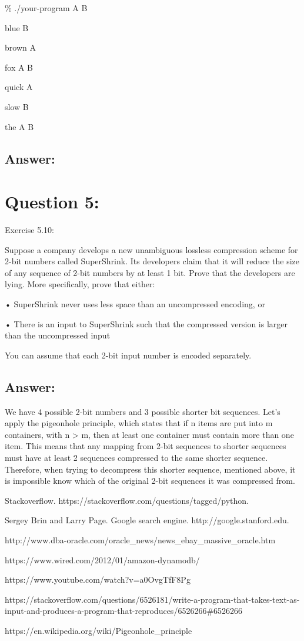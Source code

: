 \documentclass[a4paper, 11pt]{article}
\begin{document}
\% ./your-program A B

blue B

brown A

fox A B

quick A

slow B

the A B

\subsection*{Answer:}

\section*{Question 5:}
Exercise 5.10: 

Suppose a company develops a new unambiguous lossless compression scheme for 2-bit numbers called SuperShrink. Its developers claim that it will reduce the size of any sequence of 2-bit numbers by at least 1 bit. Prove that the developers are lying. More specifically, prove that either:

• SuperShrink never uses less space than an uncompressed encoding, or

• There is an input to SuperShrink such that the compressed version is larger than the uncompressed input

You can assume that each 2-bit input number is encoded separately.

\subsection*{Answer:}

We have 4 possible 2-bit numbers and 3 possible shorter bit sequences. Let's apply the pigeonhole principle, which states that if n items are put into m containers, with n > m, then at least one container must contain more than one item. This means that any mapping from 2-bit sequences to shorter sequences must have at least 2 sequences compressed to the same shorter sequence. Therefore, when trying to decompress this shorter sequence, mentioned above, it is impossible know which of the original 2-bit sequences it was compressed from.


\begin{thebibliography}{9}

\bibitem{} 
Stackoverflow. https://stackoverflow.com/questions/tagged/python.

\bibitem{} 
Sergey Brin and Larry Page. Google search engine. http://google.stanford.edu.

\bibitem{}
http://www.dba-oracle.com/oracle\_news/news\_ebay\_massive\_oracle.htm

\bibitem{}
https://www.wired.com/2012/01/amazon-dynamodb/

\bibitem{}
https://www.youtube.com/watch?v=a0OvgTfF8Pg

\bibitem{}
https://stackoverflow.com/questions/6526181/write-a-program-that-takes-text-as-input-and-produces-a-program-that-reproduces/6526266\#6526266

\bibitem{}
https://en.wikipedia.org/wiki/Pigeonhole\_principle


\end{thebibliography}
\end{document}
